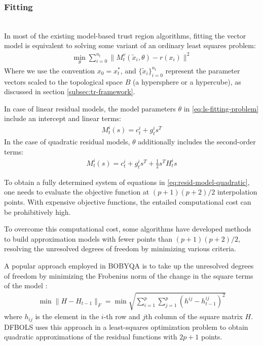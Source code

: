 \subsubsection{Fitting}
\label{subsubsec:fitting}
\hfill\\


In most of the existing model-based trust region algorithms, fitting the vector model is equivalent to solving some variant of an ordinary least squares problem:
\begin{align}
    \min\limits_{\theta}\sum\limits_{i=0}^{n_t}\lVert M_t^v(\tilde{x}_i,\theta)-r(x_i)\rVert^2
    \label{eq:ls-fitting-problem}
\end{align}
Where we use the convention $x_0=x_t^*$, and $\{\tilde{x}_i\}_{i=0}^{n_t}$ represent the parameter vectors scaled to the topological space $B$ (a hypersphere or a hypercube), as discussed in section \ref{subsec:tr-framework}.

In case of linear residual models, the model parameters $\theta$ in \ref{eq:ls-fitting-problem} include an intercept and linear terms:
\begin{align}
    M_t^i(s)= c^i_t+g_t^is^T
    \label{eq:resid-model-linear}
\end{align}
In the case of quadratic residual models, $\theta$ additionally includes the second-order terms:
\begin{align}
    M_t^i(s)= c^i_t+g_t^is^T+\frac{1}{2}s^TH_t^is
    \label{eq:resid-model-quadratic}
\end{align}

To obtain a fully determined system of equations in \ref{eq:resid-model-quadratic}, one needs to evaluate the objective function at $(p+1)(p+2)/2$ interpolation points. With expensive objective functions, the entailed computational cost can be prohibitively high.

To overcome this computational cost, some algorithms have developed methods to build approximation models with fewer points than  $(p+1)(p+2)/2$, resolving the unresolved degrees of freedom by minimizing various criteria.

A popular approach employed in BOBYQA is to take up the unresolved degrees of freedom by minimizing the Frobenius norm of the change in the square terms of the model \citep{Powell2003}:
\begin{align}
    \min\lVert H-H_{t-1}\rVert_F = \min\sqrt{\sum\limits_{i=1}^p\sum\limits_{j=1}^{p}(h^{ij}-h^{ij}_{t-1})^2}
    \label{eq:min-frob-diff}
\end{align}
where $h_{ij}$ is the element in the $i$-th row and $j$th column of the square matrix $H$. DFBOLS \citep{Zhang2010} uses this approach in a least-squares optimization problem to obtain quadratic approximations of the residual functions with $2p+1$ points.

